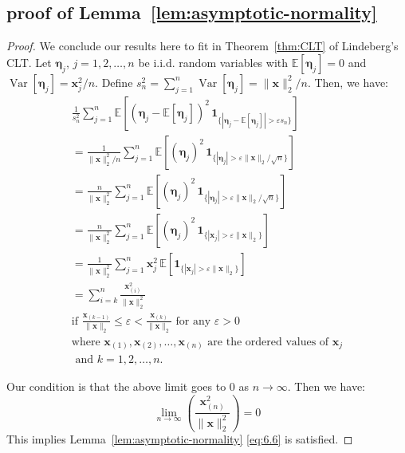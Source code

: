 \documentclass[11pt]{article}
\numberwithin{equation}{section}
\theoremstyle{plain}
\theoremstyle{definition}
\theoremstyle{remark}
\begin{document}
\begin{appendix}
\subsection{proof of Lemma~\ref{lem:asymptotic-normality}}
\begin{proof}
We conclude our results here to fit in Theorem~\ref{thm:CLT} of Lindeberg's CLT.
Let $\mathbf{\eta}_j$, $j = 1,2,\ldots,n$ be i.i.d. random variables with $\mathbb{E}[\mathbf{\eta}_j] = 0$ and $\operatorname{Var}[\mathbf{\eta}_j] = \mathbf{x}_j^2/n$.
Define $s_n^2 = \sum_{j=1}^{n} \operatorname{Var}[\mathbf{\eta}_j] = \|\mathbf{x}\|_2^2/n$.
Then, we have:
\[
\begin{aligned}
  \frac{1}{s_n^2}\sum_{j=1}^{n} \mathbb{E}\!\left[(\mathbf{\eta}_j-\mathbb{E}[\mathbf{\eta}_j])^{2}\,
  \mathbf 1_{\{|\mathbf{\eta}_j-\mathbb{E}[\mathbf{\eta}_j]|>\varepsilon s_n\}}\right]
  \\
  = \frac{1}{\|\mathbf{x}\|_2^2/n}\sum_{j=1}^{n} \mathbb{E}\!\left[(\mathbf{\eta}_j)^{2}\,
  \mathbf 1_{\{|\mathbf{\eta}_j|>\varepsilon \|\mathbf{x}\|_2/\sqrt{n}\}}\right]
  \\
  = \frac{n}{\|\mathbf{x}\|_2^2}\sum_{j=1}^{n} \mathbb{E}\!\left[(\mathbf{\eta}_j)^{2}\,
  \mathbf 1_{\{|\mathbf{\eta}_j|>\varepsilon \|\mathbf{x}\|_2/\sqrt{n}\}}\right]
  \\
  = \frac{n}{\|\mathbf{x}\|_2^2}\sum_{j=1}^{n} \mathbb{E}\!\left[(\mathbf{\eta}_j)^{2}\,
  \mathbf 1_{\{|\mathbf{x}_j|>\varepsilon \|\mathbf{x}\|_2\}}\right]
  \\
  = \frac{1}{\|\mathbf{x}\|_2^2}\sum_{j=1}^{n} \mathbf{x}_j^2\,\mathbb{E}\!\left[\mathbf 1_{\{|\mathbf{x}_j| > \varepsilon \|\mathbf{x}\|_2\}}\right]
  \\
  = \sum_{i=k}^{n} \frac{\mathbf{x}_{(i)}^2}{\|\mathbf{x}\|_2^2}
  \\
  \text{if } \frac{\mathbf{x}_{(k-1)}}{\|\mathbf{x}\|_2} \leq \varepsilon < \frac{\mathbf{x}_{(k)}}{\|\mathbf{x}\|_2}  \text{ for any } \varepsilon > 0
  \\
  \text{where } \mathbf{x}_{(1)}, \mathbf{x}_{(2)}, \ldots, \mathbf{x}_{(n)} \text{ are the ordered values of } \mathbf{x}_j
  \\
  \text{ and } k = 1, 2, \ldots, n.
\end{aligned}\]

Our condition is that the above limit goes to 0 as $n \to \infty$.
Then we have:
\[
\lim_{n\to\infty}\left(\frac{\mathbf{x}_{(n)}^2}{\|\mathbf{x}\|_2^2}\right)=0
\]
This implies Lemma~\ref{lem:asymptotic-normality} \eqref{eq:6.6} is satisfied.

\end{proof}
\end{appendix}
\end{document}
